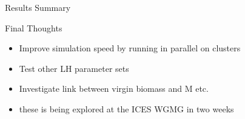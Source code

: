 \documentclass{beamer}
\begin{document}

\begin{withoutheadline}
\begin{frame}{Results Summary}

\end{frame}
\end{withoutheadline}


\begin{frame}{Final Thoughts}
  \begin{itemize}
    \item Improve simulation speed by running in parallel on clusters
    \item Test other LH parameter sets
    \item Investigate link between virgin biomass and M etc.
    \item these is being explored at the ICES WGMG in two weeks  
  \end{itemize}
\end{frame}

\end{document}
